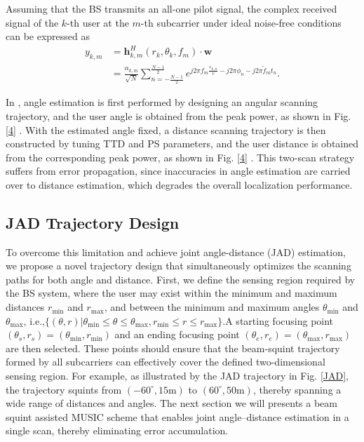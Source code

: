 \documentclass[lettersize,journal]{IEEEtran}
\begin{document}
Assuming that the BS transmits an all-one pilot signal, the complex received signal of the $k$-th user at the $m$-th subcarrier under ideal noise-free conditions can be expressed as
	\begin{equation}
		\begin{split}
			y_{k,m} &= \mathbf{h}^H_{k,m} (r_k, \theta_k, f_m) \cdot \mathbf{w} \\
			&= \frac{\alpha_{k,m}}{\sqrt{N}} \sum_{n=-\frac{N-1}{2}}^{\frac{N-1}{2}} e^{j2\pi f_m \frac{r_{k,n}}{c} - j2\pi \phi_n - j2\pi \tilde{f}_m t_n}.
		\end{split}
	\end{equation}

In \cite{luo2023beam}, angle estimation is first performed by designing an angular scanning trajectory, and the user angle is obtained from the peak power, as shown in Fig. \ref{4} . With the estimated angle fixed, a distance scanning trajectory is then constructed by tuning TTD and PS parameters, and the user distance is obtained from the corresponding peak power, as shown in Fig. \ref{4} . This two-scan strategy suffers from error propagation, since inaccuracies in angle estimation are carried over to distance estimation, which degrades the overall localization performance.

\subsection{JAD Trajectory Design}

 To overcome this limitation and achieve joint angle-distance (JAD) estimation, we propose a novel trajectory design that simultaneously optimizes the scanning paths for both angle and distance. First, we define the sensing region required by the BS system, where the user may exist within the minimum and maximum distances $r_{\text{min}}$ and $r_{\text{max}}$, and between the minimum and maximum angles $\theta_{\text{min}}$ and $\theta_{\text{max}}$, i.e.,$\{(\theta,r) |  \theta_{\text{min}} \le \theta \le \theta_{\text{max}},r_{\text{min}} \le r \le r_{\text{max}}\}$.A starting focusing point $(\theta_s,r_s)=(\theta_{\text{min}}, r_{\text{min}})$ and an ending focusing point $(\theta_e, r_e)=(\theta_{\text{max}}, r_{\text{max}})$ are then selected. These points should ensure that the beam-squint trajectory formed by all subcarriers can effectively cover the defined two-dimensional sensing region. For example, as illustrated by the JAD trajectory in Fig. \ref{JAD}, the trajectory squints from $(-60^\circ, 15\text{m})$ to $( 60^\circ, 50\text{m})$, thereby spanning a wide range of distances and angles. The next section we will presents a beam squint assisted MUSIC scheme that enables joint angle–distance estimation in a single scan, thereby eliminating error accumulation.
\end{document}

